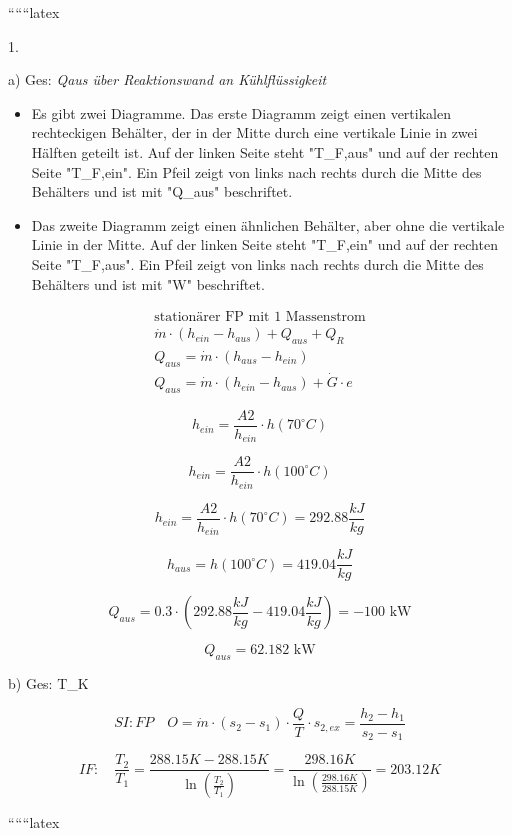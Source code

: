 
``````latex


1.

a) Ges: \textit{Qaus über Reaktionswand an Kühlflüssigkeit}

\begin{itemize}
    \item Es gibt zwei Diagramme. Das erste Diagramm zeigt einen vertikalen rechteckigen Behälter, der in der Mitte durch eine vertikale Linie in zwei Hälften geteilt ist. Auf der linken Seite steht "T_{F,aus}" und auf der rechten Seite "T_{F,ein}". Ein Pfeil zeigt von links nach rechts durch die Mitte des Behälters und ist mit "Q_{aus}" beschriftet.
    \item Das zweite Diagramm zeigt einen ähnlichen Behälter, aber ohne die vertikale Linie in der Mitte. Auf der linken Seite steht "T_{F,ein}" und auf der rechten Seite "T_{F,aus}". Ein Pfeil zeigt von links nach rechts durch die Mitte des Behälters und ist mit "W" beschriftet.
\end{itemize}

\begin{align*}
    \text{stationärer FP mit 1 Massenstrom} \\
    \dot{m} \cdot (h_{ein} - h_{aus}) + Q_{aus} + Q_R \\
    Q_{aus} = \dot{m} \cdot (h_{aus} - h_{ein}) \\
    Q_{aus} = \dot{m} \cdot (h_{ein} - h_{aus}) + \dot{G} \cdot e
\end{align*}

\[
h_{ein} = \frac{A2}{h_{ein}} \cdot h(70^\circ C)
\]

\[
h_{ein} = \frac{A2}{h_{ein}} \cdot h(100^\circ C)
\]

\[
h_{ein} = \frac{A2}{h_{ein}} \cdot h(70^\circ C) = 292.88 \frac{kJ}{kg}
\]

\[
h_{aus} = h(100^\circ C) = 419.04 \frac{kJ}{kg}
\]

\[
Q_{aus} = 0.3 \cdot (292.88 \frac{kJ}{kg} - 419.04 \frac{kJ}{kg}) = -100 \text{ kW}
\]

\[
Q_{aus} = 62.182 \text{ kW}
\]

b) Ges: T_{K}

\[
SI: FP \quad O = \dot{m} \cdot (s_2 - s_1) \cdot \frac{Q}{T} \cdot s_{2,ex} = \frac{h_2 - h_1}{s_2 - s_1}
\]

\[
IF: \quad \frac{T_2}{T_1} = \frac{288.15 K - 288.15 K}{\ln \left( \frac{T_2}{T_1} \right)} = \frac{298.16 K}{\ln \left( \frac{298.16 K}{288.15 K} \right)} = 203.12 K
\]

``````latex


